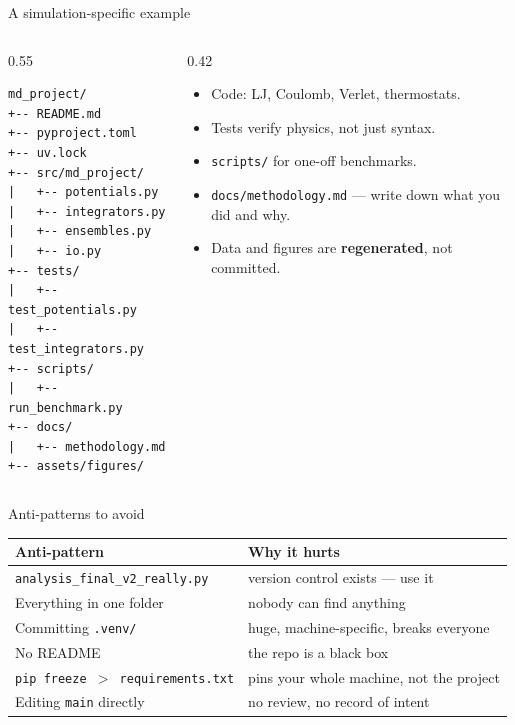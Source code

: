 \documentclass[aspectratio=169]{beamer}
\begin{document}
\begin{frame}[fragile]{A simulation-specific example}
  \begin{columns}[T]
    \begin{column}{0.55\textwidth}
      \begin{lstlisting}[basicstyle=\ttfamily\scriptsize]
md_project/
+-- README.md
+-- pyproject.toml
+-- uv.lock
+-- src/md_project/
|   +-- potentials.py
|   +-- integrators.py
|   +-- ensembles.py
|   +-- io.py
+-- tests/
|   +-- test_potentials.py
|   +-- test_integrators.py
+-- scripts/
|   +-- run_benchmark.py
+-- docs/
|   +-- methodology.md
+-- assets/figures/
      \end{lstlisting}
    \end{column}
    \begin{column}{0.42\textwidth}
      \begin{itemize}
        \item Code: LJ, Coulomb, Verlet, thermostats.
        \item Tests verify physics, not just syntax.
        \item \texttt{scripts/} for one-off benchmarks.
        \item \texttt{docs/methodology.md} --- write down what you did and why.
        \item Data and figures are \textbf{regenerated}, not committed.
      \end{itemize}
    \end{column}
  \end{columns}
\end{frame}

\begin{frame}{Anti-patterns to avoid}
  \begin{table}
    \small
    \begin{tabular}{@{}ll@{}}
      \toprule
      Anti-pattern & Why it hurts \\
      \midrule
      \texttt{analysis\_final\_v2\_really.py} & version control exists --- use it \\
      Everything in one folder & nobody can find anything \\
      Committing \texttt{.venv/} & huge, machine-specific, breaks everyone \\
      No README & the repo is a black box \\
      \texttt{pip freeze $>$ requirements.txt} & pins your whole machine, not the project \\
      Editing \texttt{main} directly & no review, no record of intent \\
      \bottomrule
    \end{tabular}
  \end{table}
\end{frame}
\end{document}
